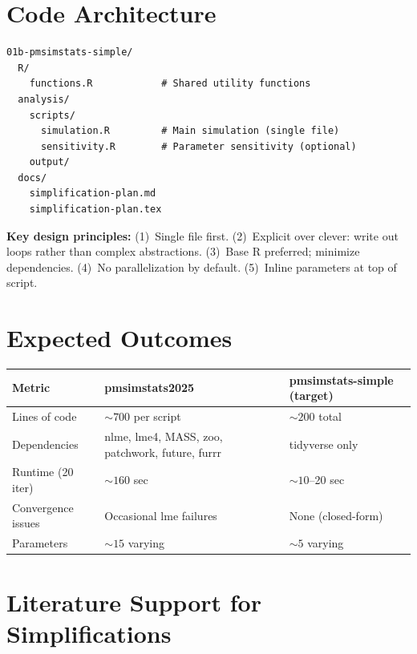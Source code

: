 \documentclass[11pt]{article}
\begin{document}
\section{Code Architecture}

\begin{Verbatim}[fontsize=\small]
01b-pmsimstats-simple/
  R/
    functions.R            # Shared utility functions
  analysis/
    scripts/
      simulation.R         # Main simulation (single file)
      sensitivity.R        # Parameter sensitivity (optional)
    output/
  docs/
    simplification-plan.md
    simplification-plan.tex
\end{Verbatim}

\textbf{Key design principles:}
(1)~Single file first.
(2)~Explicit over clever: write out loops rather than complex
abstractions.
(3)~Base R preferred; minimize dependencies.
(4)~No parallelization by default.
(5)~Inline parameters at top of script.


\section{Expected Outcomes}

\begin{table}[h]
\centering
\begin{tabular}{@{}lll@{}}
\toprule
Metric & pmsimstats2025 & pmsimstats-simple (target) \\
\midrule
Lines of code & ${\sim}700$ per script & ${\sim}200$ total \\
Dependencies & nlme, lme4, MASS, zoo, patchwork, future, furrr & tidyverse only \\
Runtime (20 iter) & ${\sim}160$ sec & ${\sim}10$--20 sec \\
Convergence issues & Occasional lme failures & None (closed-form) \\
Parameters & ${\sim}15$ varying & ${\sim}5$ varying \\
\bottomrule
\end{tabular}
\end{table}


\section{Literature Support for Simplifications}
\end{document}
